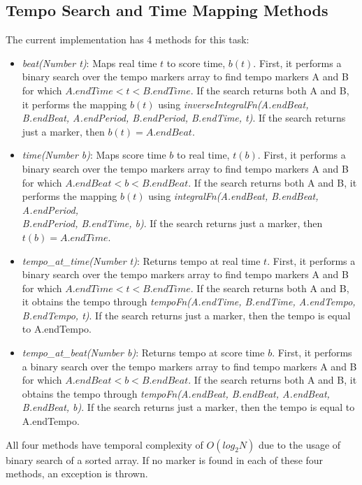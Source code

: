 \documentclass{sig-alternate}
\begin{document}
\subsection{Tempo Search and Time Mapping Methods}
\begin{sloppypar}
The current implementation has 4 methods for this task:
\begin{itemize}
	\item \textit{beat(Number t)}: Maps real time $t$ to score time, $b(t)$. First, it performs a binary search over the tempo markers array to find tempo markers A and B for which $A.endTime < t < B.endTime$. If the search returns both A and B, it performs the mapping $b(t)$ using \textit{inverseIntegralFn(A.endBeat, B.endBeat, A.endPeriod, B.endPeriod, B.endTime, t)}. If the search returns just a marker, then $b(t) = A.endBeat$.
	\item \textit{time(Number b)}: Maps score time $b$ to real time, $t(b)$. First, it performs a binary search over the tempo markers array to find tempo markers A and B for which $A.endBeat < b < B.endBeat$. If the search returns both A and B, it performs the mapping $b(t)$ using \textit{integralFn(A.endBeat, B.endBeat, A.endPeriod, \\B.endPeriod, B.endTime, b)}. If the search returns just a marker, then $t(b) = A.endTime$.
	\item \textit{tempo\_at\_time(Number t)}: Returns tempo at real time $t$. First, it performs a binary search over the tempo markers array to find tempo markers A and B for which $A.endTime < t < B.endTime$. If the search returns both A and B, it obtains the tempo through \textit{tempoFn(A.endTime, B.endTime, A.endTempo, B.endTempo, t)}. If the search returns just a marker, then the tempo is equal to A.endTempo.
	\item \textit{tempo\_at\_beat(Number b)}: Returns tempo at score time $b$. First, it performs a binary search over the tempo markers array to find tempo markers A and B for which $A.endBeat < b < B.endBeat$. If the search returns both A and B, it obtains the tempo through \textit{tempoFn(A.endBeat, B.endBeat, A.endBeat, B.endBeat, b)}. If the search returns just a marker, then the tempo is equal to A.endTempo.
\end{itemize}
All four methods have temporal complexity of $O(log_2 N)$ due to the usage of binary search of a sorted array. If no marker is found in each of these four methods, an exception is thrown.
\begin{figure}
	\centering

\end{figure}
\end{sloppypar}
\end{document}
